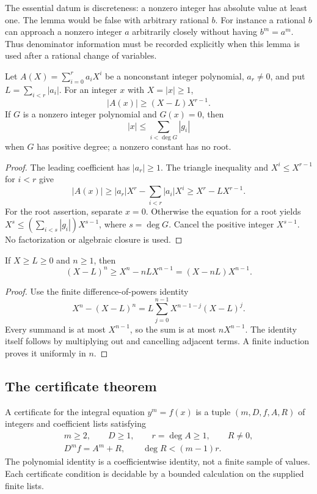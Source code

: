 The essential datum is discreteness: a nonzero integer has absolute value
at least one.  The lemma would be false with arbitrary rational $b$.
For instance a rational $b$ can approach a nonzero integer $a$ arbitrarily
closely without having $b^m=a^m$.  Thus denominator information must be
recorded explicitly when this lemma is used after a rational change of
variables.

\begin{lemma}
\label{dio:polynomialbounds}
Let $A(X)=\sum_{i=0}^r a_iX^i$ be a nonconstant integer polynomial,
$a_r\ne0$, and put $L=\sum_{i<r}|a_i|$.  For an integer $x$ with
$X=|x|\geq1$,
\[
                |A(x)|\geq(X-L)X^{r-1}.
\]
If $G$ is a nonzero integer polynomial and $G(x)=0$, then
\[
             |x|\leq\sum_{i<\deg G}|g_i|
\]
when $G$ has positive degree; a nonzero constant has no root.
\end{lemma}
\begin{proof}
The leading coefficient has $|a_r|\geq1$.  The triangle inequality and
$X^i\leq X^{r-1}$ for $i<r$ give
\[
 |A(x)|\geq |a_r|X^r-\sum_{i<r}|a_i|X^i
           \geq X^r-LX^{r-1}.
\]
For the root assertion, separate $x=0$.  Otherwise the equation for a
root yields $X^s\leq(\sum_{i<s}|g_i|)X^{s-1}$, where $s=\deg G$.
Cancel the positive integer $X^{s-1}$.  No factorization or algebraic
closure is used.
\end{proof}

\begin{lemma}
\label{dio:loss}
If $X\geq L\geq0$ and $n\geq1$, then
\[
 (X-L)^n\geq X^n-nLX^{n-1}
            =(X-nL)X^{n-1}.
\]
\end{lemma}
\begin{proof}
Use the finite difference-of-powers identity
\[
 X^n-(X-L)^n
   =L\sum_{j=0}^{n-1}X^{n-1-j}(X-L)^j.
\]
Every summand is at most $X^{n-1}$, so the sum is at most
$nX^{n-1}$.  The identity itself follows by multiplying out and
cancelling adjacent terms.  A finite induction proves it uniformly in
$n$.
\end{proof}

\subsection{The certificate theorem}

\begin{definition}
\label{dio:certificate}
A certificate for the integral equation $y^m=f(x)$ is a tuple
$(m,D,f,A,R)$ of integers and coefficient lists satisfying
\[
 \begin{gathered}
 m\geq2,\qquad D\geq1,\qquad r=\deg A\geq1,\qquad R\ne0,\\
 D^m f=A^m+R,\qquad \deg R<(m-1)r.
 \end{gathered}
\]
The polynomial identity is a coefficientwise identity, not a finite
sample of values.  Each certificate condition is decidable by a bounded
calculation on the supplied finite lists.
\end{definition}

